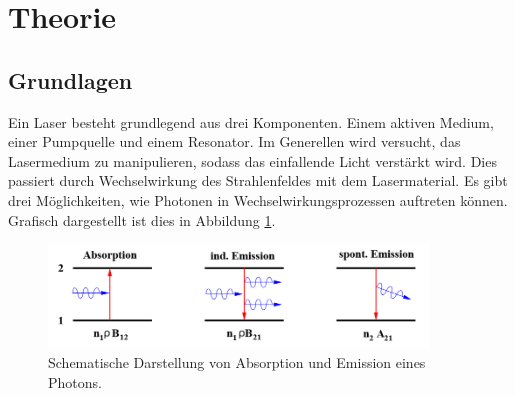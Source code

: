 \section{Theorie}
\subsection{Grundlagen}
Ein Laser besteht grundlegend aus drei Komponenten.
Einem aktiven Medium, einer Pumpquelle und einem Resonator.
Im Generellen wird versucht, das Lasermedium zu manipulieren,
sodass das einfallende Licht verstärkt wird.
Dies passiert durch Wechselwirkung des Strahlenfeldes mit dem Lasermaterial.
Es gibt drei Möglichkeiten, wie Photonen in Wechselwirkungsprozessen auftreten können.
Grafisch dargestellt ist dies in Abbildung \ref{fig:emission}.

\begin{figure}[H]
  \centering
  \includegraphics[width=0.9\textwidth]{Bilder/emission.png}
  \caption{Schematische Darstellung von Absorption und Emission eines Photons.\cite{anleitung}}
  \label{fig:emission}
\end{figure}

